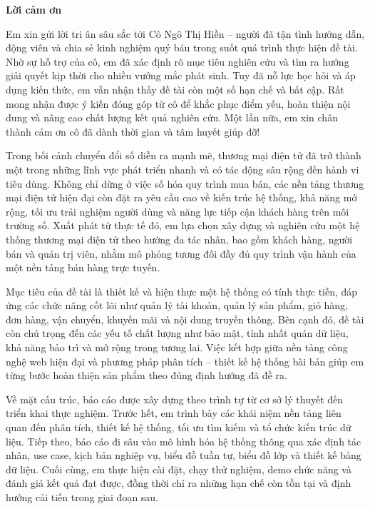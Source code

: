 \documentclass[13pt]{article}
\begin{document}
\newpage
\begin{center}
    \par \Large\textbf{Lời cảm ơn}
\end{center}
\par Em xin gửi lời tri ân sâu sắc tới Cô Ngô Thị Hiền – người đã tận tình hướng dẫn, động viên và chia sẻ kinh nghiệm quý báu trong suốt quá trình thực hiện đề tài. Nhờ sự hỗ trợ của cô, em đã xác định rõ mục tiêu nghiên cứu và tìm ra hướng giải quyết kịp thời cho nhiều vướng mắc phát sinh. Tuy đã nỗ lực học hỏi và áp dụng kiến thức, em vẫn nhận thấy đề tài còn một số hạn chế và bất cập. Rất mong nhận được ý kiến đóng góp từ cô để khắc phục điểm yếu, hoàn thiện nội dung và nâng cao chất lượng kết quả nghiên cứu. Một lần nữa, em xin chân thành cảm ơn cô đã dành thời gian và tâm huyết giúp đỡ!
\par Trong bối cảnh chuyển đổi số diễn ra mạnh mẽ, thương mại điện tử đã trở thành một trong những lĩnh vực phát triển nhanh và có tác động sâu rộng đến hành vi tiêu dùng. 
Không chỉ dừng ở việc số hóa quy trình mua bán, các nền tảng thương mại điện tử hiện đại còn đặt ra yêu cầu cao về kiến trúc hệ thống, khả năng mở rộng, tối ưu trải nghiệm người dùng và năng lực tiếp cận khách hàng trên môi trường số. 
Xuất phát từ thực tế đó, em lựa chọn xây dựng và nghiên cứu một hệ thống thương mại điện tử theo hướng đa tác nhân, bao gồm khách hàng, người bán và quản trị viên, nhằm mô phỏng tương đối đầy đủ quy trình vận hành của một nền tảng bán hàng trực tuyến.

Mục tiêu của đề tài là thiết kế và hiện thực một hệ thống có tính thực tiễn, đáp ứng các chức năng cốt lõi như quản lý tài khoản, quản lý sản phẩm, giỏ hàng, đơn hàng, vận chuyển, khuyến mãi và nội dung truyền thông. 
Bên cạnh đó, đề tài còn chú trọng đến các yếu tố chất lượng như bảo mật, tính nhất quán dữ liệu, khả năng bảo trì và mở rộng trong tương lai. 
Việc kết hợp giữa nền tảng công nghệ web hiện đại và phương pháp phân tích -- thiết kế hệ thống bài bản giúp em từng bước hoàn thiện sản phẩm theo đúng định hướng đã đề ra.

Về mặt cấu trúc, báo cáo được xây dựng theo trình tự từ cơ sở lý thuyết đến triển khai thực nghiệm. 
Trước hết, em trình bày các khái niệm nền tảng liên quan đến phân tích, thiết kế hệ thống, tối ưu tìm kiếm và tổ chức kiến trúc dữ liệu. 
Tiếp theo, báo cáo đi sâu vào mô hình hóa hệ thống thông qua xác định tác nhân, use case, kịch bản nghiệp vụ, biểu đồ tuần tự, biểu đồ lớp và thiết kế bảng dữ liệu. 
Cuối cùng, em thực hiện cài đặt, chạy thử nghiệm, demo chức năng và đánh giá kết quả đạt được, đồng thời chỉ ra những hạn chế còn tồn tại và định hướng cải tiến trong giai đoạn sau.
\end{document}
